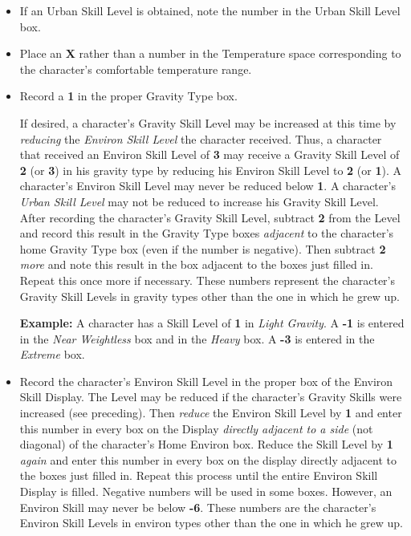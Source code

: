 \begin{itemize}
\item If an Urban Skill Level is obtained, note the number in the
  Urban Skill Level box.
\item Place an \textbf{\textsf{X}} rather than a number in the
  Temperature space corresponding to the character's comfortable
  temperature range.
\item Record a \textbf{1} in the proper Gravity Type box.
  
  If desired, a character's Gravity Skill Level may be increased at
  this time by \emph{reducing} the \emph{Environ Skill Level} the
  character received. Thus, a character that received an Environ Skill
  Level of \textbf{3} may receive a Gravity Skill Level of \textbf{2}
  (or \textbf{3}) in his gravity type by reducing his Environ Skill
  Level to \textbf{2} (or \textbf{1}). A character's Environ Skill
  Level may never be reduced below \textbf{1}. A character's
  \emph{Urban Skill Level} may not be reduced to increase his Gravity
  Skill Level. After recording the character's Gravity Skill Level,
  subtract \textbf{2} from the Level and record this result in the
  Gravity Type boxes \emph{adjacent} to the character's home Gravity
  Type box (even if the number is negative). Then subtract \textbf{2}
  \emph{more} and note this result in the box adjacent to the boxes
  just filled in. Repeat this once more if necessary. These numbers
  represent the character's Gravity Skill Levels in gravity types
  other than the one in which he grew up.
  
  \textbf{Example:} A character has a Skill Level of \textbf{1} in
  \emph{Light Gravity}. A \textbf{-1} is entered in the \emph{Near
    Weightless} box and in the \emph{Heavy} box. A \textbf{-3} is
  entered in the \emph{Extreme} box.
  
\item Record the character's Environ Skill Level in the proper box of
  the Environ Skill Display. The Level may be reduced if the
  character's Gravity Skills were increased (see preceding). Then
  \emph{reduce} the Environ Skill Level by \textbf{1} and enter this
  number in every box on the Display \emph{directly adjacent to a
    side} (not diagonal) of the character's Home Environ box. Reduce
  the Skill Level by \textbf{1} \emph{again} and enter this number in
  every box on the display directly adjacent to the boxes just filled
  in. Repeat this process until the entire Environ Skill Display is
  filled. Negative numbers will be used in some boxes. However, an
  Environ Skill may never be below \textbf{-6}. These numbers are the
  character's Environ Skill Levels in environ types other than the one
  in which he grew up.
\end{itemize}

